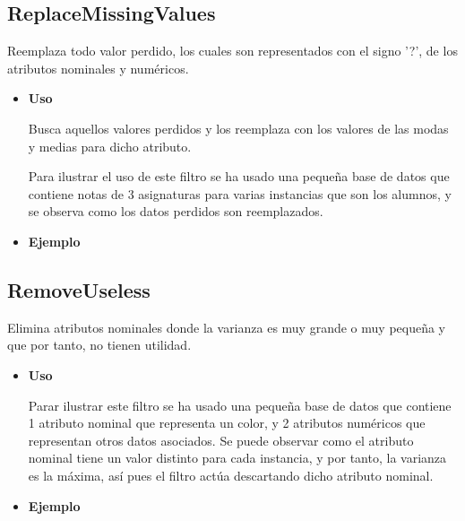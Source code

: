
	\subsection{ReplaceMissingValues}
	\begin{justify}
	Reemplaza todo valor perdido, los cuales son representados con el signo '?', de los atributos nominales y numéricos.
	\end{justify}

	\begin{itemize}
		\item \textbf{Uso}
		\begin{justify}
			Busca aquellos valores perdidos y los reemplaza con los valores de las modas y medias para dicho atributo.
		\end{justify}
		\begin{justify}
			Para ilustrar el uso de este filtro se ha usado una pequeña base de datos que contiene notas de 3 asignaturas para varias instancias que son los alumnos, y se observa como los datos perdidos son reemplazados.
		\end{justify}
		\item \textbf{Ejemplo}
	\end{itemize}

\subsection{RemoveUseless}
	\begin{justify}
		Elimina atributos nominales donde la varianza es muy grande o muy pequeña y que por tanto, no tienen utilidad.
	\end{justify}

	\begin{itemize}
		\item \textbf{Uso}

		\begin{justify}
			Parar ilustrar este filtro se ha usado una pequeña base de datos que contiene 1 atributo nominal que representa un color, y 2 atributos numéricos que representan otros datos asociados. Se puede observar como el atributo nominal tiene un valor distinto para cada instancia, y por tanto, la varianza es la máxima, así pues el filtro actúa descartando dicho atributo nominal.
		\end{justify}

		\item \textbf{Ejemplo}
	\end{itemize}

